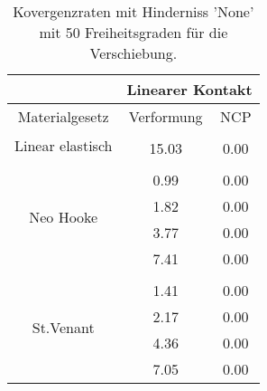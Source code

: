 \begin{table} 
\centering 
\begin{tabular}{c|cc|} 
\cline{2-3} 
 & \multicolumn{2}{|c|}{Linearer Kontakt} \\ 
\hline 
\multicolumn{1}{|c|}{Materialgesetz} & \multicolumn{1}{c|}{Verformung} & \multicolumn{1}{c|}{NCP} \\ 
\hline 
\multicolumn{1}{|c|}{\multirow{2}{*}{Linear elastisch}} &\multicolumn{1}{|c|}{} & \multicolumn{1}{|c|}{} \\ 
\multicolumn{1}{|c|}{} & \multicolumn{1}{|c|}{     15.03} & \multicolumn{1}{|c|}{      0.00} \\ 
\hline 
\multicolumn{1}{|c|}{\multirow{5}{*}{Neo Hooke}} &\multicolumn{1}{|c|}{} & \multicolumn{1}{|c|}{} \\ 
\multicolumn{1}{|c|}{} & \multicolumn{1}{|c|}{      0.99} & \multicolumn{1}{|c|}{      0.00} \\ 
\multicolumn{1}{|c|}{} & \multicolumn{1}{|c|}{      1.82} & \multicolumn{1}{|c|}{      0.00} \\ 
\multicolumn{1}{|c|}{} & \multicolumn{1}{|c|}{      3.77} & \multicolumn{1}{|c|}{      0.00} \\ 
\multicolumn{1}{|c|}{} & \multicolumn{1}{|c|}{      7.41} & \multicolumn{1}{|c|}{      0.00} \\ 
\hline 
\multicolumn{1}{|c|}{\multirow{5}{*}{St.Venant}} &\multicolumn{1}{|c|}{} & \multicolumn{1}{|c|}{} \\ 
\multicolumn{1}{|c|}{} & \multicolumn{1}{|c|}{      1.41} & \multicolumn{1}{|c|}{      0.00} \\ 
\multicolumn{1}{|c|}{} & \multicolumn{1}{|c|}{      2.17} & \multicolumn{1}{|c|}{      0.00} \\ 
\multicolumn{1}{|c|}{} & \multicolumn{1}{|c|}{      4.36} & \multicolumn{1}{|c|}{      0.00} \\ 
\multicolumn{1}{|c|}{} & \multicolumn{1}{|c|}{      7.05} & \multicolumn{1}{|c|}{      0.00} \\ 
\hline 
\end{tabular}\caption{Kovergenzraten mit Hinderniss 'None' mit 50 Freiheitsgraden für die Verschiebung.}\label{tab:Rate_None_level1}
\end{table} 
